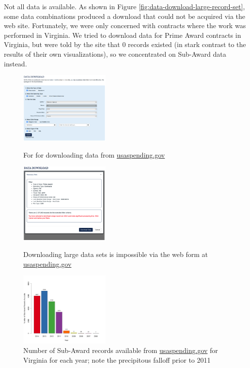 \documentclass[10pt,journal,compsoc]{IEEEtran}
\begin{document}
Not all data is available.  As shown in Figure \ref{fig:data-download-large-record-set}, some data combinations produced a download that could not be acquired via the web site.  Fortunately, we were only concerned with contracts where the work was performed in Virginia.  We tried to download data for Prime Award contracts in Virginia, but were told by the site that 0 records existed (in stark contrast to the results of their own visualizations), so we concentrated on Sub-Award data instead.

\begin{figure}[htbp]
	\centering
	\includegraphics[width=0.4\textwidth]{images/data-download.png}
	\caption{For for downloading data from \protect\url{usaspending.gov}}
	\label{fig:data-download}
	
	\vspace{3em}
	
	\includegraphics[width=0.4\textwidth]{images/data-download-large-record-set.png}
	\caption{Downloading large data sets is impossible via the web form at \protect\url{usaspending.gov}}
	\label{fig:data-download-large-record-set}

	\vspace{3em}

	\centering
	\includegraphics[width=0.4\textwidth]{images/numrecords-barplot.png}
	\caption{Number of Sub-Award records available from \protect\url{usaspending.gov} for Virginia for each year; note the precipitous falloff prior to 2011}
	\label{fig:numrecords-barplot}	
\end{figure}
\end{document}

